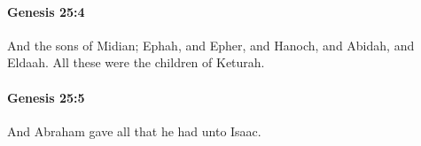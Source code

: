 		\paragraph{Genesis 25:4} %
			\label{GENESIS-25-4}

			And the sons of Midian; Ephah, and Epher, and Hanoch, and Abidah, and Eldaah. All these were the children of Keturah.


		\paragraph{Genesis 25:5} %
			\label{GENESIS-25-5}

			And Abraham gave all that he had unto Isaac.


